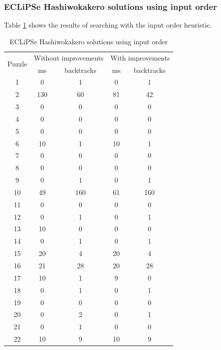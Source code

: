 \documentclass{report}
\begin{document}
\subsubsection{ECLiPSe Hashiwokakero solutions using input order}
Table \ref{table:hashi-1} shows the results of searching with the input order heuristic.
\begin{table}[h!]
  \begin{tabular}{|c|c|c|c|c|}
    \hline
    \multirow{2}{*}{Puzzle} &
    \multicolumn{2}{L|}{Without improvements} &
    \multicolumn{2}{L|}{With improvements}\\
    & ms & backtracks & ms & backtracks \\
    \hline
        1 & 0 & 1 & 0 & 1 \\
        2 & 130 & 60 & 81 & 42 \\
        3 & 0 & 0 & 0 & 0 \\
        4 & 0 & 0 & 0 & 0 \\
        5 & 0 & 0 & 0 & 0 \\
        6 & 10 & 1 & 10 & 1 \\
        7 & 0 & 0 & 0 & 0 \\
        8 & 0 & 0 & 0 & 0 \\
        9 & 0 & 1 & 0 & 1 \\
        10 & 49 & 160 & 61 & 160 \\
        11 & 0 & 0 & 0 & 0 \\
        12 & 0 & 1 & 0 & 1 \\
        13 & 10 & 0 & 0 & 0 \\
        14 & 0 & 1 & 0 & 1 \\
        15 & 20 & 4 & 20 & 4 \\
        16 & 21 & 28 & 20 & 28 \\
        17 & 10 & 1 & 9 & 0 \\
        18 & 0 & 1 & 0 & 1 \\
        19 & 0 & 0 & 0 & 0 \\
        20 & 0 & 2 & 0 & 1 \\
        21 & 0 & 1 & 0 & 0 \\
        22 & 10 & 9 & 10 & 9 \\
    \hline
  \end{tabular}
  \caption{ECLiPSe Hashiwokakero solutions using input order}
  \label{table:hashi-1}
\end{table}
\end{document}
